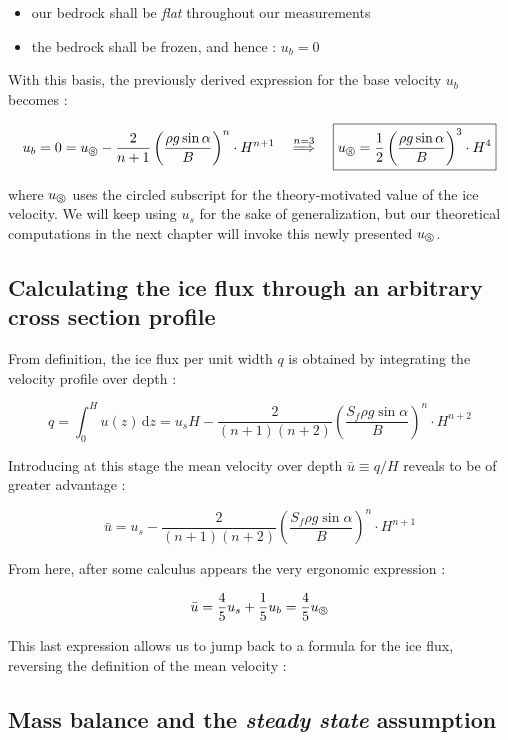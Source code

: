 \documentclass[11pt]{report}
\begin{document}
\begin{itemize}
    \item our bedrock shall be \textit{flat} throughout our measurements
    \item the bedrock shall be frozen, and hence : $u_b = 0$
\end{itemize}

With this basis, the previously derived expression for the base velocity $u_b$ becomes :

\[u_b = 0 = u_\circledS - \frac{2}{n + 1} \left( \frac{\rho g \sin{\alpha}}{B}\right)^n \cdot H^{n+1}
\quad
\stackrel{n = 3}{\Longrightarrow}
\quad
\boxed{u_\circledS = \frac{1}{2} \left( \frac{\rho g \sin{\alpha}}{B}\right)^3 \cdot H^4}\]

where $u_\circledS$ uses the circled subscript for the theory-motivated value of the ice velocity. We will keep using $u_s$ for the sake of generalization, but our theoretical computations in the next chapter will invoke this newly presented $u_\circledS$. 


\subsection*{Calculating the ice flux through an arbitrary cross section profile}

From definition, the ice flux per unit width $q$ is obtained by integrating the velocity profile over depth :

\[q = \int_0^H u(z) \, \mathrm{d} z = u_s H - \frac{2}{(n+1)(n+2)} \left( \frac{S_f \rho g \sin{\alpha}}{B}\right)^n \cdot H^{n+2}\]

Introducing at this stage the mean velocity over depth $\bar{u} \equiv q/H$ reveals to be of greater advantage :

\[\bar{u} = u_s - \frac{2}{(n+1)(n+2)} \left( \frac{S_f \rho g \sin{\alpha}}{B}\right)^n \cdot H^{n+1}\]

From here, after some calculus appears the very ergonomic expression :

\[\bar{u} = \frac{4}{5}u_s + \frac{1}{5}u_b = \frac{4}{5}u_\circledS\]

This last expression allows us to jump back to a formula for the ice flux, reversing the definition of the mean velocity :

\begin{center}
\end{center}


\subsection*{Mass balance and the \textit{steady state} assumption}
\end{document}
